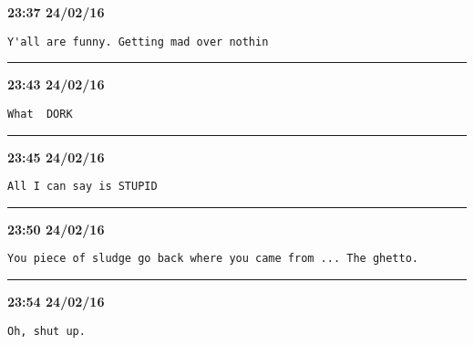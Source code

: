 \begin{adjustwidth}{0cm}{0cm}
\footnotesize \textbf{23:37 24/02/16}

\begin{lstlisting}[breaklines, breakatwhitespace, basicstyle=\small, frame=leftline]
Y'all are funny. Getting mad over nothin
\end{lstlisting}
\end{adjustwidth}

\hrule%

\begin{adjustwidth}{0cm}{0cm}
\footnotesize \textbf{23:43 24/02/16}

\begin{lstlisting}[breaklines, breakatwhitespace, basicstyle=\small, frame=leftline]
What  DORK
\end{lstlisting}
\end{adjustwidth}

\hrule%

\begin{adjustwidth}{0cm}{0cm}
\footnotesize \textbf{23:45 24/02/16}

\begin{lstlisting}[breaklines, breakatwhitespace, basicstyle=\small, frame=leftline]
All I can say is STUPID
\end{lstlisting}
\end{adjustwidth}

\hrule%

\begin{adjustwidth}{0cm}{0cm}
\footnotesize \textbf{23:50 24/02/16}

\begin{lstlisting}[breaklines, breakatwhitespace, basicstyle=\small, frame=leftline]
You piece of sludge go back where you came from ... The ghetto.
\end{lstlisting}
\end{adjustwidth}

\hrule%

\begin{adjustwidth}{0cm}{0cm}
\footnotesize \textbf{23:54 24/02/16}

\begin{lstlisting}[breaklines, breakatwhitespace, basicstyle=\small, frame=leftline]
Oh, shut up.
\end{lstlisting}
\end{adjustwidth}

